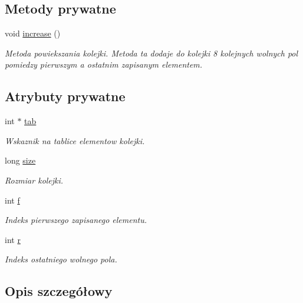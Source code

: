 \subsection*{Metody prywatne}
\begin{DoxyCompactItemize}
\item 
void \hyperlink{class_kolejka_ab4f51f0ec7fef36a85af6cfd1c257427}{increase} ()
\begin{DoxyCompactList}\small\item\em Metoda powiekszania kolejki. Metoda ta dodaje do kolejki 8 kolejnych wolnych pol pomiedzy pierwszym a ostatnim zapisanym elementem. \end{DoxyCompactList}\end{DoxyCompactItemize}
\subsection*{Atrybuty prywatne}
\begin{DoxyCompactItemize}
\item 
int $\ast$ \hyperlink{class_kolejka_a49e444e7bd7b91a78bc2a46426b73128}{tab}
\begin{DoxyCompactList}\small\item\em Wskaznik na tablice elementow kolejki. \end{DoxyCompactList}\item 
long \hyperlink{class_kolejka_a84898848de8e77a76a6f2e4a7393b4bb}{size}
\begin{DoxyCompactList}\small\item\em Rozmiar kolejki. \end{DoxyCompactList}\item 
int \hyperlink{class_kolejka_ae66597dc9eb1fcc210b075f8aa7ff77f}{f}
\begin{DoxyCompactList}\small\item\em Indeks pierwszego zapisanego elementu. \end{DoxyCompactList}\item 
int \hyperlink{class_kolejka_ae16213a5b751800eb48da6bede435ad0}{r}
\begin{DoxyCompactList}\small\item\em Indeks ostatniego wolnego pola. \end{DoxyCompactList}\end{DoxyCompactItemize}


\subsection{Opis szczegółowy}


